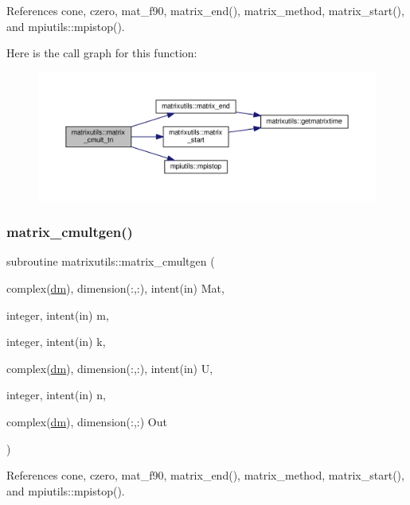 References cone, czero, mat\+\_\+f90, matrix\+\_\+end(), matrix\+\_\+method, matrix\+\_\+start(), and mpiutils\+::mpistop().

Here is the call graph for this function\+:
\nopagebreak
\begin{figure}[H]
\begin{center}
\leavevmode
\includegraphics[width=350pt]{namespacematrixutils_a7c5f8b5e283bec1dcdcc4b82abbebd47_cgraph}
\end{center}
\end{figure}
\mbox{\label{namespacematrixutils_af451dede0e0f43908b5f8fdbd6b64717}} 
\subsubsection{\texorpdfstring{matrix\+\_\+cmultgen()}{matrix\_cmultgen()}}
{\footnotesize\ttfamily subroutine matrixutils\+::matrix\+\_\+cmultgen (\begin{DoxyParamCaption}\item[{complex(\mbox{\hyperlink{namespacematrixutils_a7bdc564986ea4d90f51201c75606ef3d}{dm}}), dimension(\+:,\+:), intent(in)}]{Mat,  }\item[{integer, intent(in)}]{m,  }\item[{integer, intent(in)}]{k,  }\item[{complex(\mbox{\hyperlink{namespacematrixutils_a7bdc564986ea4d90f51201c75606ef3d}{dm}}), dimension(\+:,\+:), intent(in)}]{U,  }\item[{integer, intent(in)}]{n,  }\item[{complex(\mbox{\hyperlink{namespacematrixutils_a7bdc564986ea4d90f51201c75606ef3d}{dm}}), dimension(\+:,\+:)}]{Out }\end{DoxyParamCaption})}



References cone, czero, mat\+\_\+f90, matrix\+\_\+end(), matrix\+\_\+method, matrix\+\_\+start(), and mpiutils\+::mpistop().

